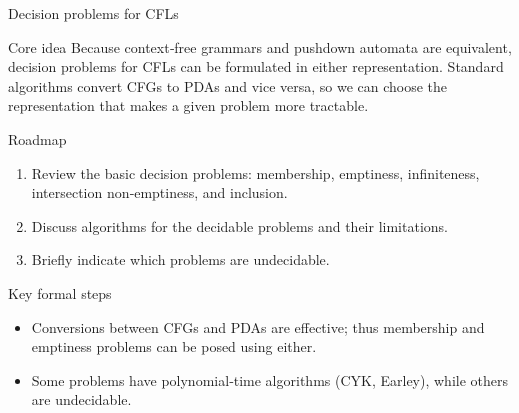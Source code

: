 \begin{frame}[t]{Decision problems for CFLs}
  \begin{tblock}{Core idea}
    Because context‑free grammars and pushdown automata are equivalent,
    decision problems for CFLs can be formulated in either representation.
    Standard algorithms convert CFGs to PDAs and vice versa, so we can
    choose the representation that makes a given problem more tractable.
  \end{tblock}
  \begin{tblock}{Roadmap}
    \begin{enumerate}
      \item Review the basic decision problems: membership, emptiness,
        infiniteness, intersection non‑emptiness, and inclusion.
      \item Discuss algorithms for the decidable problems and their
        limitations.
      \item Briefly indicate which problems are undecidable.
    \end{enumerate}
  \end{tblock}
  \begin{tblock}{Key formal steps}
    \begin{itemize}
      \item Conversions between CFGs and PDAs are effective; thus
        membership and emptiness problems can be posed using either.
      \item Some problems have polynomial‑time algorithms (CYK,
        Earley), while others are undecidable.
    \end{itemize}
  \end{tblock}
  \label{fr:6.3-01}
\end{frame}


